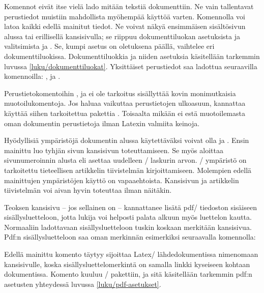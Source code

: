 Komennot eivät itse vielä lado mitään tekstiä dokumenttiin. Ne vain
tallentavat perustiedot muistiin mahdollista myöhempää käyttöä varten.
Komennolla  voi latoa kaikki edellä mainitut tiedot.
Ne voivat näkyä ensimmäisen sisältösivun alussa tai erillisellä
kansisivulla; se riippuu dokumenttiluokan asetuksista ja valitsimista
 ja . Se, kumpi asetus on oletuksena
päällä, vaihtelee eri dokumenttiluokissa. Dokumenttiluokkia ja niiden
asetuksia käsitellään tarkemmin luvussa \ref{luku/dokumenttiluokat}.
Yksittäiset perustiedot saa ladottua seuraavilla komennoilla:
,  ja .

Perustietokomentoihin ,  ja
 ei ole tarkoitus sisällyttää kovin monimutkaisia
muotoilukomentoja. Jos haluaa vaikuttaa perustietojen ulkoasuun,
kannattaa käyttää siihen tarkoitettua pakettia .
Toisaalta mikään ei estä muotoilemasta oman dokumentin perustietoja
ilman Latexin valmiita keinoja.

Hyödyllisiä ympäristöjä dokumentin alussa käytettäväksi voivat olla
 ja . Ensin mainittu luo
tyhjän sivun kansisivun toteuttamiseen. Se myös aloittaa sivunumeroinnin
alusta eli asettaa uudelleen \-/ laskurin arvon.
\-/ ympäristö on tarkoitettu tieteellisen artikkelin
tiivistelmän kirjoittamiseen. Molempien edellä mainittujen ympäristöjen
käyttö on vapaaehtoista. Kansisivun ja artikkelin tiivistelmän voi aivan
hyvin toteuttaa ilman näitäkin.

Teoksen kansisivu -- jos sellainen on -- kannattanee lisätä pdf\-/
tiedoston sisäiseen sisällysluetteloon, jotta lukija voi helposti palata
alkuun myös luettelon kautta. Normaaliin ladottavaan sisällysluetteloon
tuskin koskaan merkitään kansisivua. Pdf:n sisällysluetteloon saa oman
merkinnän esimerkiksi seuraavalla komennolla:

\begin{koodilohkosis}
\end{koodilohkosis}

\noindent
Edellä mainittu komento  täytyy sijoittaa Latex\-/
lähdedokumentissa nimenomaan kansisivulle, koska
sisällysluettelomerkintä on samalla linkki kyseiseen kohtaan
dokumentissa. Komento kuuluu \-/ pakettiin, ja sitä
käsitellään tarkemmin pdf:n asetusten yhteydessä luvussa
\ref{luku/pdf-asetukset}.

